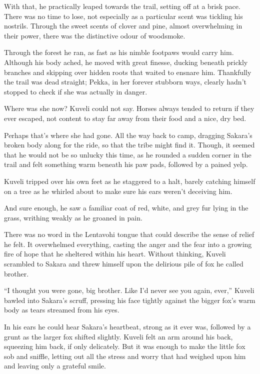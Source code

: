 With that, he practically leaped towards the trail, setting off at a brisk pace. There was no time to lose, not especially as a particular scent was tickling his nostrils. Through the sweet scents of clover and pine, almost overwhelming in their power, there was the distinctive odour of woodsmoke.

Through the forest he ran, as fast as his nimble footpaws would carry him. Although his body ached, he moved with great finesse, ducking beneath prickly branches and skipping over hidden roots that waited to ensnare him. Thankfully the trail was dead straight; Pekka, in her forever stubborn ways, clearly hadn't stopped to check if she was actually in danger.

Where was she now? Kuveli could not say. Horses always tended to return if they ever escaped, not content to stay far away from their food and a nice, dry bed.

Perhaps that's where she had gone. All the way back to camp, dragging Sakara's broken body along for the ride, so that the tribe might find it. Though, it seemed that he would not be so unlucky this time, as he rounded a sudden corner in the trail and felt something warm beneath his paw pads, followed by a pained yelp.

Kuveli tripped over his own feet as he staggered to a halt, barely catching himself on a tree as he whirled about to make sure his ears weren't deceiving him.

And sure enough, he saw a familiar coat of red, white, and grey fur lying in the grass, writhing weakly as he groaned in pain.

There was no word in the Lentavohi tongue that could describe the sense of relief he felt. It overwhelmed everything, casting the anger and the fear into a growing fire of hope that he sheltered within his heart. Without thinking, Kuveli scrambled to Sakara and threw himself upon the delirious pile of fox he called brother.

``I thought you were gone, big brother. Like I'd never see you again, ever,'' Kuveli bawled into Sakara's scruff, pressing his face tightly against the bigger fox's warm body as tears streamed from his eyes.

In his ears he could hear Sakara's heartbeat, strong as it ever was, followed by a grunt as the larger fox shifted slightly. Kuveli felt an arm around his back, squeezing him back, if only delicately. But it was enough to make the little fox sob and sniffle, letting out all the stress and worry that had weighed upon him and leaving only a grateful smile.

